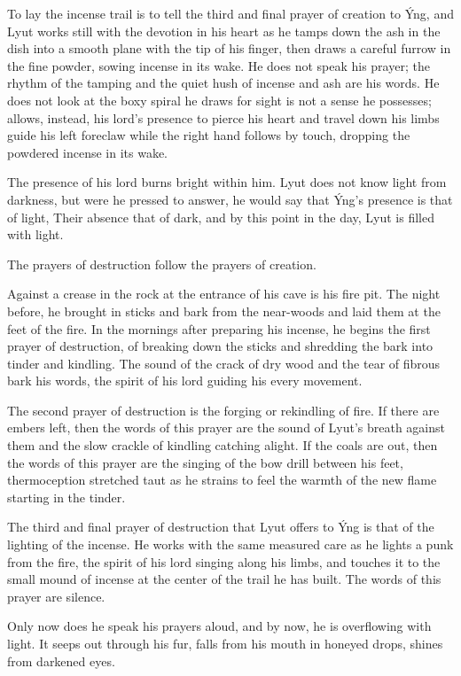 To lay the incense trail is to tell the third and final prayer of creation to Ýng, and Lyut works still with the devotion in his heart as he tamps down the ash in the dish into a smooth plane with the tip of his finger, then draws a careful furrow in the fine powder, sowing incense in its wake. He does not speak his prayer; the rhythm of the tamping and the quiet hush of incense and ash are his words. He does not look at the boxy spiral he draws for sight is not a sense he possesses; allows, instead, his lord's presence to pierce his heart and travel down his limbs guide his left foreclaw while the right hand follows by touch, dropping the powdered incense in its wake.

The presence of his lord burns bright within him. Lyut does not know light from darkness, but were he pressed to answer, he would say that Ýng's presence is that of light, Their absence that of dark, and by this point in the day, Lyut is filled with light.

The prayers of destruction follow the prayers of creation.

Against a crease in the rock at the entrance of his cave is his fire pit. The night before, he brought in sticks and bark from the near-woods and laid them at the feet of the fire. In the mornings after preparing his incense, he begins the first prayer of destruction, of breaking down the sticks and shredding the bark into tinder and kindling. The sound of the crack of dry wood and the tear of fibrous bark his words, the spirit of his lord guiding his every movement.

The second prayer of destruction is the forging or rekindling of fire. If there are embers left, then the words of this prayer are the sound of Lyut's breath against them and the slow crackle of kindling catching alight. If the coals are out, then the words of this prayer are the singing of the bow drill between his feet, thermoception stretched taut as he strains to feel the warmth of the new flame starting in the tinder.

The third and final prayer of destruction that Lyut offers to Ýng is that of the lighting of the incense. He works with the same measured care as he lights a punk from the fire, the spirit of his lord singing along his limbs, and touches it to the small mound of incense at the center of the trail he has built. The words of this prayer are silence.

Only now does he speak his prayers aloud, and by now, he is overflowing with light. It seeps out through his fur, falls from his mouth in honeyed drops, shines from darkened eyes.

